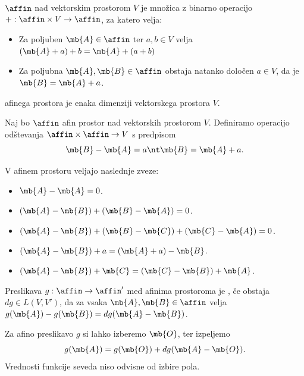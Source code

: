 
\begin{definicija}
   $\affin$ nad vektorskim prostorom $V$ je množica z
  binarno operacijo $+: \affin \times V \to \affin$, za katero velja:
  \begin{itemize}
  \item Za poljuben $\mb{A} \in \affin$ ter $a, b \in V$ velja $(\mb{A} +
    a) + b = \mb{A} + (a + b)$
  \item Za poljubna $\mb{A}, \mb{B} \in \affin$ obstaja natanko določen $a \in
    V$, da je $\mb{B} = \mb{A} + a$.
  \end{itemize}
   afinega prostora je enaka dimenziji vektorskega prostora
  $V$.
\end{definicija}

\begin{definicija}
  Naj bo $\affin$ afin prostor nad vektorskih prostorom $V$.
  Definiramo operacijo odštevanja $\affin \times \affin \to V$ s
  predpisom
  \[
    \mb{B} - \mb{A} = a \nt \mb{B} = \mb{A} + a.
  \]
\end{definicija}

\begin{trditev}
  V afinem prostoru veljajo naslednje zveze:
  \begin{itemize}
  \item $\mb{A} - \mb{A} = 0$.
  \item $(\mb{A} - \mb{B}) + (\mb{B} - \mb{A}) = 0$.
  \item $(\mb{A} - \mb{B}) + (\mb{B} - \mb{C}) + (\mb{C} - \mb{A}) = 0$.
  \item $(\mb{A} - \mb{B}) + a = (\mb{A} + a) - \mb{B}$.
  \item $(\mb{A} - \mb{B}) + \mb{C} = (\mb{C} - \mb{B}) + \mb{A}$.
  \end{itemize}
\end{trditev}

\begin{definicija}
  Preslikava $g : \affin \to \affin'$ med afinima prostoroma je
  , če obstaja $dg \in L(V, V')$, da za vsaka $\mb{A}, \mb{B} \in
  \affin$ velja $g(\mb{A}) - g(\mb{B}) = dg(\mb{A} - \mb{B})$.
\end{definicija}

Za afino preslikavo $g$ si lahko izberemo  $\mb{O}$, ter izpeljemo
\[
  g(\mb{A}) = g(\mb{O}) + dg(\mb{A} - \mb{O}).
\]
Vrednosti funkcije seveda niso odvisne od izbire pola.

